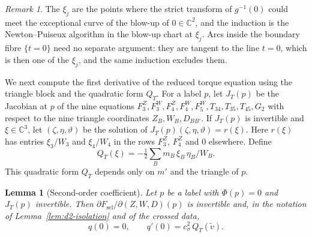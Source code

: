 \documentclass[11pt]{amsart}
\newtheorem{lemma}[theorem]{Lemma}
\theoremstyle{definition}
\theoremstyle{remark}
\newtheorem{remark}[theorem]{Remark}
\newcommand{\C}{\mathbb{C}}
\begin{document}
\begin{remark}\label{rem:d2-corank-two}
The $\xi_j$ are the points where the strict transform of $g^{-1}(0)$ could meet the exceptional
curve of the blow-up of $0\in\C^2$, and the induction is the Newton--Puiseux algorithm in the
blow-up chart at $\xi_j$.  Arcs inside the boundary fibre $\{t=0\}$ need no separate argument:
they are tangent to the line $t=0$, which is then one of the $\xi_j$, and the same induction
excludes them.
\end{remark}

{We next compute the first derivative of the reduced torque equation
using the triangle block and the quadratic form $Q_T$.
For a label $p$, let $J_T(p)$ be the
Jacobian at $p$ of the nine equations
$F^Z_3,F^W_3,F^Z_4,F^W_4,F^W_5,T_{34},T_{35},T_{45},G_2$ with respect to the nine triangle
coordinates $Z_B,W_B,D_{BB'}$.  If $J_T(p)$ is invertible and $\xi\in\C^3$, let
$(\zeta,\eta,\vartheta)$ be the solution of $J_T(p)(\zeta,\eta,\vartheta)=r(\xi)$.
Here $r(\xi)$ has entries $\xi_3/W_3$ and $\xi_4/W_4$ in the rows $F^Z_3$, $F^Z_4$ and $0$
elsewhere.  Define}
\[
  Q_T(\xi)=-\tfrac12\textstyle\sum_Bm_B\,\xi_B\,\eta_B/W_B .
\]
{This quadratic form $Q_T$ depends only on $m'$ and the triangle of $p$.}

\begin{lemma}[Second-order coefficient]\label{lem:d2-second}
Let $p$ be a label with $\Phi(p)=0$ and $J_T(p)$ invertible.  Then
$\partial F_{\mathrm{sel}}/\partial(Z,W,D)(p)$ is invertible and, in the notation of
Lemma~\ref{lem:d2-isolation} and of the crossed data,
\[
  q(0)=0,\qquad q'(0)=c_\sigma^2\,Q_T(\tilde v).
\]
\end{lemma}
\end{document}
